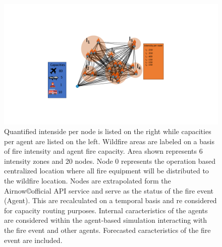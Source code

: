 \documentclass[preprint,review, 11pt,3p,authoryear]{elsarticle}
\newcommand{\rev}{\color{black}} %
\begin{document}

\begin{figure}[!htbp]
\centering
\includegraphics[scale=0.65]{figs/Infograph.pdf}
\caption{Quantified intenside per node is listed on the right while capacities per agent are listed on the left. Wildfire areas are labeled on a basis of fire intensity and agent fire capacity. 
Area shown represents 6 intensity zones and 20 nodes. Node 0 represents the operation based centralized location where all fire equipment will be distributed to the wildfire location. Nodes are extrapolated form the Airnow\copyright official API service and serve as the status of the fire event (Agent). This are recalculated on a temporal basis and re considered for capacity routing purposes.
Internal caracteristics of the agents are considered within the agent-based simulation interacting with the fire event and other agents. Forecasted caracteristics of the fire event are included.}
\label{fig01}
\end{figure}
\end{document}
